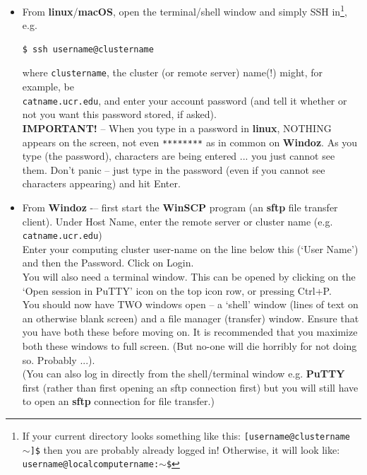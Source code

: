 \begin{itemize}
\vspace{1mm}
\item From \textbf{linux}/\textbf{macOS}, open the terminal/shell window and simply SSH in\footnote{If your current directory looks something like this: \texttt{[username@clustername \(\sim\)]\$}
then you are probably already logged in! Otherwise, it will look like: \texttt{username@localcomputername:\(\sim\)\$}}, e.g.

\vspace{-1mm}\begin{verbatim}
$ ssh username@clustername
\end{verbatim}\vspace{-1mm}

where \texttt{clustername}, the cluster (or remote server) name(!) might, for example, be
\\\texttt{catname.ucr.edu}, and enter your  account password (and tell it whether or not you want this password stored, if asked).
\vspace{1mm}
\\\textbf{IMPORTANT!} -- When you type in a password in \textbf{linux}, NOTHING appears on the screen, not even \texttt{********} as in common on \textbf{Windoz}. As you type (the password), characters are being entered ... you just cannot see them. Don't panic -- just type in the password (even if you cannot see characters appearing) and hit \textsf{\scriptsize Enter}.

\vspace{1mm}
\item From \textbf{Windoz} -– first start the \textbf{WinSCP} program (an \textbf{sftp} file transfer client). Under \textsf{\footnotesize Host Name}, enter the remote server or cluster name (e.g. \texttt{catname.ucr.edu})
\\Enter your computing cluster user-name on the line below this (‘\textsf{\footnotesize User Name}’) and then the \textsf{\footnotesize Password}. Click on \textsf{\footnotesize Login}.
\\You will also need a terminal window. This can be opened by clicking on the ‘\textsf{\footnotesize Open session in PuTTY}’ icon on the top icon row, or pressing \textsf{\footnotesize Ctrl+P}. \\You should now have TWO windows open – a ‘shell’ window (lines of text on an otherwise blank screen) and a file manager (transfer) window. Ensure that you have both these before moving on. It is recommended that you maximize both these windows to full screen. (But no-one will die horribly for not doing so. Probably ...).
\\(You can also log in directly from the shell/terminal window e.g. \textbf{PuTTY} first (rather than first opening an sftp connection first) but you will still have to open an \textbf{sftp} connection for file transfer.)
\end{itemize}

